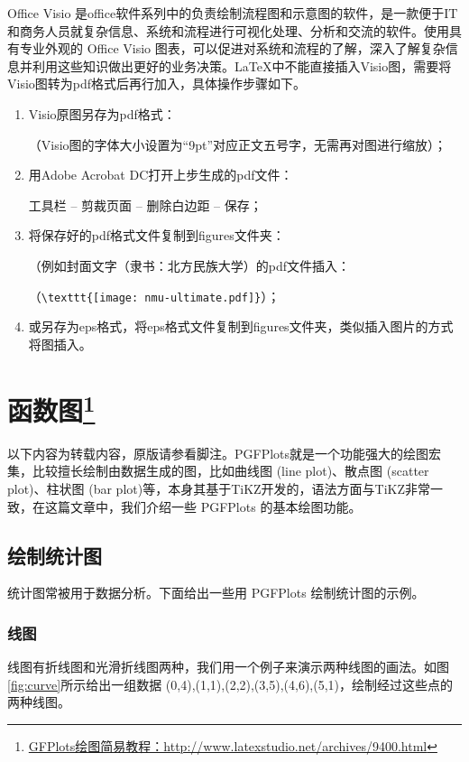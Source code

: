 Office Visio 是office软件系列中的负责绘制流程图和示意图的软件，是一款便于IT和商务人员就复杂信息、系统和流程进行可视化处理、分析和交流的软件。使用具有专业外观的 Office Visio 图表，可以促进对系统和流程的了解，深入了解复杂信息并利用这些知识做出更好的业务决策。\LaTeX{}中不能直接插入Visio图，需要将Visio图转为pdf格式后再行加入，具体操作步骤如下。

\begin{enumerate}[label=\arabic*)]
	\item Visio原图另存为pdf格式：
	
	\qquad（Visio图的字体大小设置为“9pt”对应正文五号字，无需再对图进行缩放）；
		
	\item 用Adobe Acrobat DC打开上步生成的pdf文件：
	
	\qquad 工具栏 -- 剪裁页面 -- 删除白边距 -- 保存；
	
	\item 将保存好的pdf格式文件复制到figures文件夹：
	
	\qquad （例如封面文字（隶书：北方民族大学）的pdf文件插入： 
	
    \qquad	（\verb|\texttt{[image: nmu-ultimate.pdf]}|）；
		
	\item 或另存为eps格式，将eps格式文件复制到figures文件夹，类似插入图片的方式将图插入。
\end{enumerate}


\section{函数图\footnote{\href{http://www.latexstudio.net/archives/9400.html}{GFPlots绘图简易教程：http://www.latexstudio.net/archives/9400.html}}}

以下内容为转载内容，原版请参看脚注。PGFPlots就是一个功能强大的绘图宏集，比较擅长绘制由数据生成的图，比如曲线图 (line plot)、散点图 (scatter plot)、柱状图 (bar plot)等，本身其基于TiKZ开发的，语法方面与TiKZ非常一致，在这篇文章中，我们介绍一些 PGFPlots 的基本绘图功能。

\subsection{绘制统计图}
统计图常被用于数据分析。下面给出一些用 PGFPlots 绘制统计图的示例。

\subsubsection{线图}
线图有折线图和光滑折线图两种，我们用一个例子来演示两种线图的画法。如图\ref{fig:curve}所示给出一组数据 {(0,4),(1,1),(2,2),(3,5),(4,6),(5,1)}，绘制经过这些点的两种线图。


